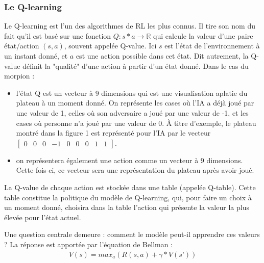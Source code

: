 \documentclass[french]{article}
\begin{document}
    \subsubsection{Le Q-learning}
    Le Q-learning est l'un des algorithmes de RL les plus connus. Il tire son nom du fait qu'il est basé sur une fonction $Q:s * a \rightarrow \mathbb{R}$ qui calcule la valeur d'une paire état/action $(s, a)$, souvent appelée Q-value. Ici $s$ est l'état de l'environnement à un instant donné, et $a$ est une action possible dans cet état. Dit autrement, la Q-value définit la "qualité" d'une action à partir d'un état donné. Dans le cas du morpion :
    \begin{itemize}
        \item l'état Q est un vecteur à 9 dimensions qui est une visualisation aplatie du plateau à un moment donné. On représente les cases où l'IA a déjà joué par une valeur de 1, celles où son adversaire a joué par une valeur de -1, et les cases où personne n'a joué par une valeur de 0. À titre d'exemple, le plateau montré dans la figure 1 est représenté pour l'IA par le vecteur $\begin{bmatrix}0&0&0&-1&0&0&0&1&1\end{bmatrix}$.
        \item on représentera également une action comme un vecteur à 9 dimensions. Cette fois-ci, ce vecteur sera une représentation du plateau après avoir joué.
    \end{itemize}

    La Q-value de chaque action est stockée dans une table (appelée Q-table). Cette table constitue la politique du modèle de Q-learning, qui, pour faire un choix à un moment donné, choisira dans la table l'action qui présente la valeur la plus élevée pour l'état actuel.

    Une question centrale demeure : comment le modèle peut-il apprendre ces valeurs ? La réponse est apportée par l'équation de Bellman :
    \begin{align*} 
        V(s)=max_a(R(s,a)+ \gamma*V(s’))
    \end{align*}
    
\end{document}
